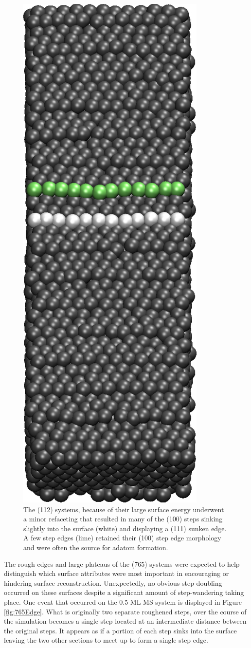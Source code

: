 \begin{figure}
\centering
\includegraphics[width=0.3\linewidth]{../figures/appB/112_sunken.pdf}
\caption{The (112) systems, because of their large surface energy underwent a
minor refaceting that resulted in many of the (100) steps sinking slightly into
the surface (white) and displaying a (111) sunken edge. A few step edges (lime)
retained their (100) step edge morphology and were often the source for adatom
formation.}
\label{fig:112sunken}
\end{figure}
\newpage



The rough edges and large plateaus of the (765) systems were expected to help
distinguish which surface attributes were most important in encouraging or
hindering surface reconstruction. Unexpectedly, no obvious step-doubling
occurred on these surfaces despite a significant amount of step-wandering
taking place. One event that occurred on the 0.5 ML MS system is displayed in
Figure \ref{fig:765Edge}. What is originally two separate roughened steps, over
the course of the simulation becomes a single step located at an intermediate
distance between the original steps. It appears as if a portion of each step
sinks into the surface leaving the two other sections to meet up to form a
single step edge.

